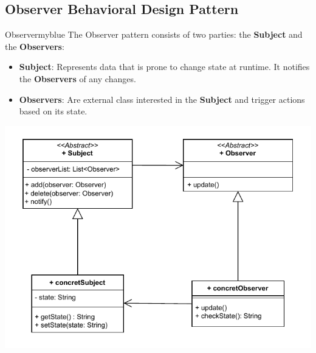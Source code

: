 \newpage

\subsection{Observer Behavioral Design Pattern}
\begin{prettyBox}{Observer}{myblue}
The Observer pattern consists of two parties: the \textbf{Subject} and the \textbf{Observers}:
\begin{itemize}
    \item \textbf{Subject}: Represents data that is prone to change state at runtime. It notifies the \textbf{Observers} of any changes.
    \item \textbf{Observers}: Are external class interested in the \textbf{Subject} and trigger actions based on its state.
\end{itemize}
\end{prettyBox}

\vspace{1cm}


\begin{center}
\includegraphics[height=0.35\textheight]{Chapters/DesignPattern/Observer/obs1.drawio.pdf}
\end{center}

\vspace{1cm}

